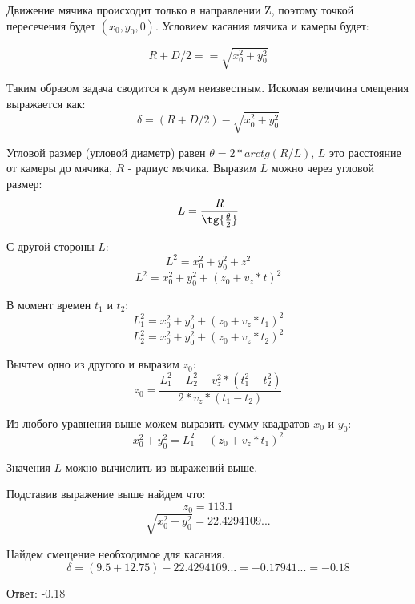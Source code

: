 \solutionSection
Движение мячика происходит только в направлении Z, поэтому точкой пересечения будет $(x_0, y_0, 0)$.  Условием касания мячика и камеры будет:

\[R + D/2 == \sqrt{x_0^2 + y_0^2} \]

Таким образом задача сводится к двум неизвестным. Искомая величина смещения выражается как:
\[\delta = (R + D/2) - \sqrt{x_0^2 + y_0^2}\]

Угловой размер (угловой диаметр) равен $\theta = 2*arctg(R/L)$, $L$ это расстояние  от камеры до мячика, $R$ - радиус мячика. Выразим $L$ можно через угловой размер:
\[ L = \frac{R}{\tg{\frac{\theta}{2}}} \]

С другой стороны $L$:
\[L^2 = x_0^2 + y_0^2 + z^2 \]
\[L^2 = x_0^2 + y_0^2 + (z_0 + v_z*t)^2 \]

В момент времен $t_1$ и $t_2$:
\[L_1^2 = x_0^2 + y_0^2 + (z_0 + v_z*t_1)^2 \]
\[L_2^2 = x_0^2 + y_0^2 + (z_0 + v_z*t_2)^2 \]

Вычтем одно из другого и выразим $z_0$:
\[ z_0 = \frac{L_1^2 - L_2^2 - v_z^2 * (t_1^2 - t_2^2)}{2*v_z*(t_1 - t_2)} \]

Из любого уравнения выше можем выразить сумму квадратов $x_0$ и $y_0$:
\[x_0^2 + y_0^2 = L_1^2 - (z_0 + v_z*t_1)^2 \]

Значения $L$ можно вычислить из выражений выше.

Подставив выражение выше найдем что:
\[ z_0 =  113.1\]
\[ \sqrt{x_0^2 + y_0^2} =  22.4294109...\]

Найдем смещение необходимое для касания.
\[ \delta = (9.5 + 12.75) - 22.4294109... = -0.17941... = -0.18\]

Ответ: -0.18